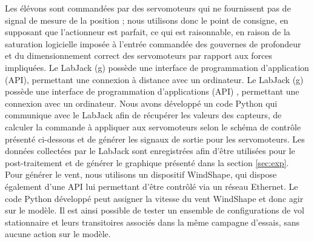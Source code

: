 Les élévons sont commandées par des servomoteurs qui ne fournissent pas de signal de mesure de la position ; nous utilisons donc le point de consigne, en supposant que l'actionneur est parfait, ce qui est raisonnable, en raison de la saturation logicielle imposée à l'entrée commandée des gouvernes de profondeur et du dimensionnement correct des servomoteurs par rapport aux forces impliquées. Le LabJack (g) possède une interface de programmation d'application (API), permettant une connexion à distance avec un ordinateur.
Le LabJack (g) possède une interface de programmation d'applications (API) , permettant une connexion avec un ordinateur. Nous avons développé un code Python qui communique avec le LabJack afin de récupérer les valeurs des capteurs, de calculer la commande à appliquer aux servomoteurs selon le schéma de contrôle présenté ci-dessous et de générer les signaux de sortie pour les servomoteurs. Les données collectées par le LabJack sont enregistrées afin d'être utilisées pour le post-traitement et de générer le graphique présenté dans la section \ref{sec:exp}. \\
Pour générer le vent, nous utilisons un dispositif WindShape, qui dispose également d'une API lui permettant d'être contrôlé via un réseau Ethernet. Le code Python développé peut assigner la vitesse du vent WindShape et donc agir sur le modèle. Il est ainsi possible de tester un ensemble de configurations de vol stationnaire et leurs transitoires associés dans la même campagne d'essais, sans aucune action sur le modèle. 


